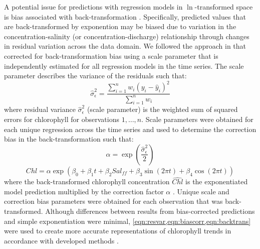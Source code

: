 \documentclass[letterpaper,12pt,oneside]{article}\usepackage{graphicx, color}
\begin{document}
A potential issue for predictions with regression models in $\ln$-transformed space is bias associated with back-transformation \citep{Duan83}.  Specifically, predicted values that are back-transformed by exponention may be biased due to variation in the concentration-salinity (or concentration-discharge) relationship through changes in residual variation across the data domain.  We followed the approach in \citet{Moyer12} that corrected for back-transformation bias using a scale parameter that is independently estimated for all regression models in the time series.  The scale parameter describes the variance of the residuals such that: 
\begin{equation}\label{eqn:resvar}
\hat{\sigma}_\epsilon^2 =\frac{\sum\limits_{{i = 1}}^n w_i \left(y_i - \hat{y}_i \right)^2}{\sum\limits_{{i = 1}}^n w_i }
\end{equation}
\noindent where residual variance $\hat{\sigma}_\epsilon^2$ (scale parameter) is the weighted sum of squared errors for chlorophyll for observations $1,\ldots,n$.  Scale parameters were obtained for each unique regression across the time series and used to determine the correction bias in the back-transformation such that:
\begin{equation}\label{eqn:biascorr}
\alpha = \exp\left(\frac{\hat{\sigma}_\epsilon^2}{2}\right)
\end{equation}
\begin{equation}\label{eqn:backtrans}
\hat{Chl} = \alpha \exp\left(\beta_0 + \beta_1 t + \beta_2 Sal_{ff} + \beta_3 \sin\left(2\pi t\right) + \beta_4 \cos\left(2\pi t\right)\right)
\end{equation}
\noindent where the back-transformed chlorophyll concentration $\hat{Chl}$ is the exponentiated model prediction multiplied by the correction factor $\alpha$ \citep{Moyer12}.  Unique scale and correction bias parameters were obtained for each observation that was back-transformed.  Although differences between results from bias-corrected predictions and simple exponentiation were minimal, \cref{eqn:resvar,eqn:biascorr,eqn:backtrans} were used to create more accurate representations of chlorophyll trends in accordance with developed methods \citep[i.e.,][]{Hirsch10,Moyer12}. 
\end{document}
